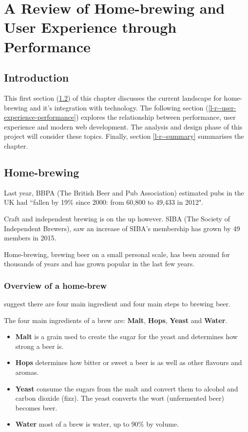 \chapter{A Review of Home-brewing and User Experience through Performance} \label{l-r}

\section{Introduction} \label{l-r--introduction}

This first section (\ref{l-r--home-brewing}) of this chapter discusses the current landscape for home-brewing and it's integration with technology. The following section (\ref{l-r--user-experience-performance}) explores the relationship between performance, user experience and modern web development. The analysis and design phase of this project will consider these topics. Finally, section \ref{l-r--summary} summarises the chapter.

\section{Home-brewing} \label{l-r--home-brewing}

Last year, BBPA (The British Beer and Pub Association) estimated pubs in the UK had ``fallen by 19\% since 2000: from 60,800 to 49,433 in 2012". \cite{BBPA}

Craft and independent brewing is on the up however. SIBA (The Society of Independent Brewers), saw an increase of  SIBA’s membership has grown by 49 members in 2015. \cite{SIBA}

Home-brewing, brewing beer on a small personal scale, has been around for thousands of years and has grown popular in the last few years.

\subsection{Overview of a home-brew}

\cite{brewing_overview} suggest there are four main ingredient and four main steps to brewing beer.

The four main ingredients of a brew are: \textbf{Malt}, \textbf{Hops}, \textbf{Yeast} and \textbf{Water}.

\begin{itemize}
  \item \textbf{Malt} is a grain used to create the sugar for the yeast and determines how strong a beer is.
  \item \textbf{Hops} determines how bitter or sweet a beer is as well as other flavours and aromas.
  \item \textbf{Yeast} consume the sugars from the malt and convert them to alcohol and carbon dioxide (fizz). The yeast converts the wort (unfermented beer) becomes beer.
  \item \textbf{Water} most of a brew is water, up to 90\% by volume.
\end{itemize}

